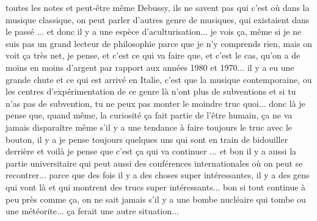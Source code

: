 toutes les notes et peut-être même Debussy, ils ne savent pas qui c'est où dans la musique classique, on peut parler d'autres genre de musiques, qui existaient dans le passé ... et donc il y a une espèce d'aculturisation... je vois ça, même si je ne suis pas un grand lecteur de philosophie parce que je n'y comprends rien, mais on voit ça très net, je pense, et c'est ce qui va faire que, et c'est le cas, qu'on a de moins en moins d'argent par rapport aux années 1980 et 1970... il y a eu une grande chute et ce qui est arrivé en Italie, c'est que la musique contemporaine, ou les centres d'expérimentation de ce genre là n'ont plus de subventions et si tu n'as pas de subvention, tu ne peux pas monter le moindre truc quoi... donc là je pense que, quand même, la curiosité ça fait partie de l'être humain, ça ne va jamais disparaître même s'il y a une tendance à faire toujours le truc avec le bouton, il y a je pense toujours quelques uns qui sont en train de bidouiller derrière et voilà je pense que c'est ça qui va continuer ... et bon il y a aussi la partie universitaire qui peut aussi des conférences internationales où on peut se recontrer... parce que des fois il y a des choses super intéressantes, il y a des gens qui vont là et qui montrent des trucs super intéressants... bon si tout continue à peu près comme ça, on ne sait jamais s'il y a une bombe nucléaire qui tombe ou une météorite... ça ferait une autre situation... 



